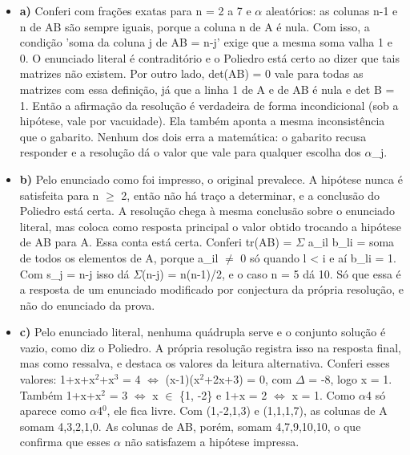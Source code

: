 \documentclass{article}%
\begin{document}
\begin{itemize}%
\item%
\textbf{a)} Conferi com frações exatas para n = 2 a 7 e $\alpha$ aleatórios: as colunas n-1 e n de AB são sempre iguais, porque a coluna n de A é nula. Com isso, a condição 'soma da coluna j de AB = n-j' exige que a mesma soma valha 1 e 0. O enunciado literal é contraditório e o Poliedro está certo ao dizer que tais matrizes não existem. Por outro lado, det(AB) = 0 vale para todas as matrizes com essa definição, já que a linha 1 de A e de AB é nula e det B = 1. Então a afirmação da resolução é verdadeira de forma incondicional (sob a hipótese, vale por vacuidade). Ela também aponta a mesma inconsistência que o gabarito. Nenhum dos dois erra a matemática: o gabarito recusa responder e a resolução dá o valor que vale para qualquer escolha dos $\alpha$\_j.%
\item%
\textbf{b)} Pelo enunciado como foi impresso, o original prevalece. A hipótese nunca é satisfeita para n $\geq$ 2, então não há traço a determinar, e a conclusão do Poliedro está certa. A resolução chega à mesma conclusão sobre o enunciado literal, mas coloca como resposta principal o valor obtido trocando a hipótese de AB para A. Essa conta está certa. Conferi tr(AB) = $\Sigma$ a\_il b\_li = soma de todos os elementos de A, porque a\_il $\neq$ 0 só quando l < i e aí b\_li = 1. Com s\_j = n-j isso dá $\Sigma$(n-j) = n(n-1)/2, e o caso n = 5 dá 10. Só que essa é a resposta de um enunciado modificado por conjectura da própria resolução, e não do enunciado da prova.%
\item%
\textbf{c)} Pelo enunciado literal, nenhuma quádrupla serve e o conjunto solução é vazio, como diz o Poliedro. A própria resolução registra isso na resposta final, mas como ressalva, e destaca os valores da leitura alternativa. Conferi esses valores: 1+x+x$^2$+x$^3$ = 4 $\Leftrightarrow$ (x-1)(x$^2$+2x+3) = 0, com $\Delta$ = -8, logo x = 1. Também 1+x+x$^2$ = 3 $\Leftrightarrow$ x $\in$ \{1, -2\} e 1+x = 2 $\Leftrightarrow$ x = 1. Como $\alpha$4 só aparece como $\alpha$4$^{0}$, ele fica livre. Com (1,-2,1,3) e (1,1,1,7), as colunas de A somam 4,3,2,1,0. As colunas de AB, porém, somam 4,7,9,10,10, o que confirma que esses $\alpha$ não satisfazem a hipótese impressa.%
\end{itemize}%
\end{document}
